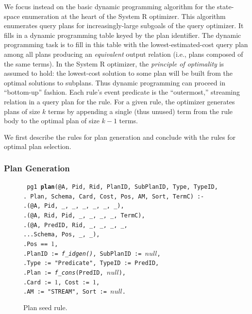 \documentclass{sigmod08}
\newcommand{\datalogspace}{\textcolor[gray]{1}{.}\hspace{0.5in}}
\begin{document}
We focus instead on the basic dynamic programming algorithm for the
state-space enumeration at the heart of the System R optimizer.  This
algorithm enumerates query plans for increasingly-large subgoals of the
query optimizer.  It fills in a dynamic programming table keyed by the
plan identifier.  The dynamic programming task is
to fill in this table with the lowest-estimated-cost query plan among
all plans producing an {\em equivalent} output relation (i.e., plans
composed of the same terms).  
In the System R optimizer, the {\em principle of
optimality} is assumed to hold: the lowest-cost solution to some
plan will be built from the optimal solutions to subplans.  Thus dynamic
programming can proceed in ``bottom-up'' fashion.  Each rule's event
predicate is the ``outermost,'' streaming relation in a query plan for the rule.  For a given rule,
the optimizer generates plans of size $k$ terms by appending a single
(thus unused)
term from the rule body to the optimal plan of
size $k-1$ terms.

We first describe the rules for plan generation and conclude with the
rules for optimal plan selection.

\subsubsection{Plan Generation}
\label{sec:plangen}

\begin{figure}
\centering
\begin{boxedminipage}{\linewidth}
\scriptsize{\tt
pg1 {\small \bf plan}(@A, Pid, Rid, PlanID, SubPlanID, Type, TypeID, \\
\datalogspace \xspace Plan, Schema, Card, Cost, Pos, AM, Sort, TermC) :- \\
\datalogspace {\small \bf systemr::programEvent}(@A, Pid, \_, \_, \_, \_, \_, \_),\\
\datalogspace {\small \bf rule}(@A, Rid, Pid, \_, \_, \_, \_, TermC),\\
\datalogspace {\small \bf predicate}(@A, PredID, Rid, \_, \_, \_, \_, \\
\datalogspace \datalogspace \datalogspace Schema, Pos, \_, \_),\\
\datalogspace Pos == $1$,\\
\datalogspace PlanID := {\em f\_idgen()}, SubPlanID := $null$,\\
\datalogspace Type := "Predicate", TypeID := PredID,\\
\datalogspace Plan := {\em f\_cons}(PredID, $null$),\\
\datalogspace Card := $1$, Cost := $1$,\\
\datalogspace AM := "STREAM", Sort := $null$.
}
\caption{\label{fig:planseed}Plan seed rule.}
\end{boxedminipage}
\end{figure}
\end{document}
